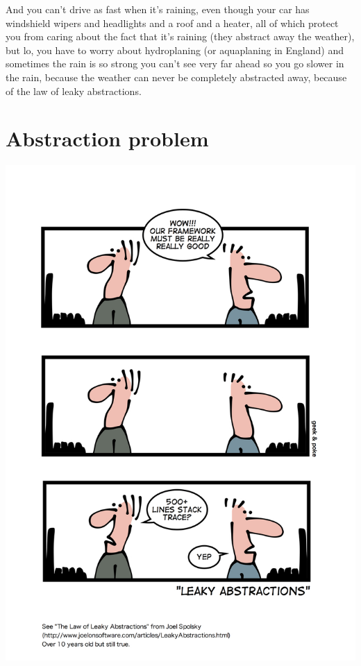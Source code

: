 \documentclass{article}
\begin{document}
\begin{compactitem}
\item And you can't drive as fast when it's raining, even though your car has windshield wipers and headlights and a roof and a heater, all of which protect you from caring about the fact that it's raining (they abstract away the weather), but lo, you have to worry about hydroplaning (or aquaplaning in England) and sometimes the rain is so strong you can't see very far ahead so you go slower in the rain, because the weather can never be completely abstracted away, because of the law of leaky abstractions.
\end{compactitem}

\section{Abstraction problem}

\begin{center}
\includegraphics{good-framework.jpg}
\end{center}
\end{document}
